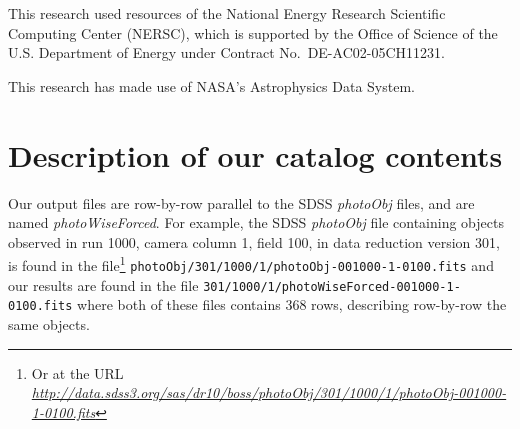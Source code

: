 \documentclass[12pt,preprint]{aastex}
\newcommand{\niceurl}[1]{\href{#1}{\textsl{#1}}}
\begin{document}
This research used resources of the National Energy Research
Scientific Computing Center (NERSC), which is supported by the Office
of Science of the U.S. Department of Energy under Contract
No.~DE-AC02-05CH11231.

This research has made use of NASA's Astrophysics Data System.


\appendix

\section{Description of our catalog contents}
\label{sec:catalog}

\newcommand{\filetype}[1]{\textsl{#1}}

Our output files are row-by-row parallel to the SDSS
\filetype{photoObj} files, and are named \filetype{photoWiseForced}.
For example, the SDSS \filetype{photoObj} file containing objects
observed in run 1000, camera column 1, field 100, in data reduction
version 301, is found in the file\footnote{Or at the URL
  \niceurl{http://data.sdss3.org/sas/dr10/boss/photoObj/301/1000/1/photoObj-001000-1-0100.fits}}
%
\verb+photoObj/301/1000/1/photoObj-001000-1-0100.fits+
%
and our results are found in the file
%
\verb+301/1000/1/photoWiseForced-001000-1-0100.fits+
%
where both of these files contains 368 rows, describing row-by-row the
same objects.

\newcommand{\colname}[1]{\texttt{#1}}
\end{document}
